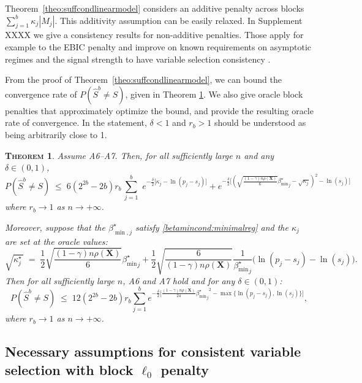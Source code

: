 \documentclass[aos]{imsart}
\theoremstyle{plain}
\newtheorem{thm}{\textsc{Theorem}}[section]
\newcommand{\bs}{\boldsymbol}
\begin{document}
Theorem~\ref{theo:suffcondlinearmodel} considers an additive penalty across blocks
$\sum_{j=1}^b \kappa_j|M_j|$. This additivity assumption can be easily relaxed. In Supplement XXXX we give a consistency results for non-additive penalties. Those apply for example
to the EBIC penalty \citep{EBIC} and improve on known requirements on asymptotic regimes and the signal strength to have variable selection consistency \cite{ebicdiverging}.

From the proof of Theorem~\ref{theo:suffcondlinearmodel}, we can bound the convergence rate of $P(\hat S^{b}\neq S)$, given in Theorem \ref{prop:fullrecovreg}. We also give oracle block penalties that approximately optimize the bound, and provide the resulting oracle rate of convergence. 
In the statement, $\delta<1$ and $r_b>1$ should be understood as being arbitrarily close to 1.
\begin{thm}\label{prop:fullrecovreg}
Assume A6--A7. Then, for all sufficiently large $n$ and any $\delta \in (0,1)$,
\begin{equation}\label{eq:rateconvreg}
 P(\hat{S}^{b} \neq S)\;\leq\; 6(2^{2b}-2b)r_b\,\sum_{j=1}^b\,\, e^{-\tfrac{\delta}{2}\big[\kappa_j-\ln(p_j-s_j)\big]} + 
    e^{-\tfrac{\delta}{2}\big[(\sqrt{\frac{(1-\gamma) n\rho(\bs X)}{6}}{{\beta_{\min}^{\star}}_j} - \sqrt{\kappa_j})^2 -\ln(s_j) \big]}
\end{equation}
where $r_b\to 1$ as $n\to +\infty$.

Moreover, suppose that the $\beta^\star_{\min,j}$ satisfy \eqref{betamincond:minimalreg} and the $\kappa_j$ are set at the oracle values:
	\begin{equation} \label{eq:oraclepenreg}
\sqrt{\kappa^\star_j\,} \;=\; \frac12\sqrt{\frac{(1-\gamma) n\rho(\bs X)}{6}}{{\beta_{\min}^{\star}}_j}+\frac12\sqrt{\frac{6}{(1-\gamma) n\rho(\bs X)}}\frac{1}{{\beta_{\min}^{\star}}_j}\big(\ln({p_j-s_j})-\ln({s_j})\big).
\end{equation}
Then for all sufficiently large $n$, A6 and A7 hold and for any $\delta \in (0,1)$: 
\begin{equation}\label{eq:oraclerateconvreg}
    P(\hat{S}^{b} \neq S) \; \leq \; 12(2^{2b}-2b)r_b \sum_{j=1}^b e^{-\tfrac{\delta}{2}\big[\frac{(1-\gamma) n\rho(\bs X)}{24}{{\beta_{\min}^{\star}}_j}^2-\max\{\ln(p_j-s_j),\ln(s_j)\}\big]},
\end{equation}
where $r_b\to 1$ as $n\to+\infty$.
\end{thm}

\subsection{Necessary assumptions for consistent variable selection with block $\ell_0$ penalty}\label{ssec:neccond_linreg}
\end{document}
